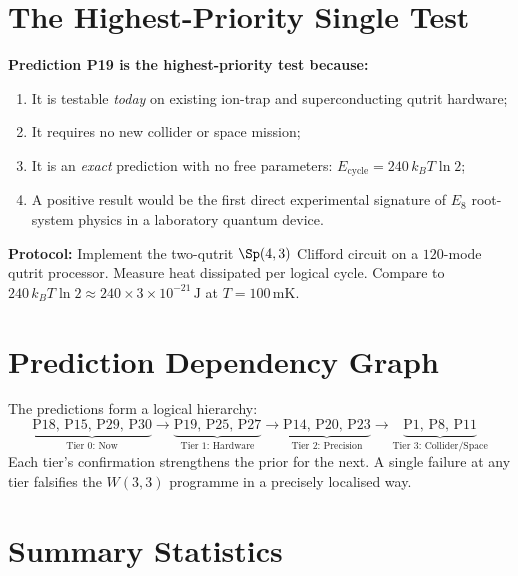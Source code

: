 \section{The Highest-Priority Single Test}
\label{sec:highest_priority}

\begin{tcolorbox}[colback=red!4!white,colframe=red!70!black,
  title=\textbf{Highest-Priority Experimental Test: P19}]
\textbf{Prediction P19 is the highest-priority test because:}
\begin{enumerate}[nosep]
  \item It is testable \emph{today} on existing ion-trap
        and superconducting qutrit hardware;
  \item It requires no new collider or space mission;
  \item It is an \emph{exact} prediction with no free
        parameters: $E_{\mathrm{cycle}}=240\,k_BT\ln 2$;
  \item A positive result would be the first direct
        experimental signature of $E_8$ root-system
        physics in a laboratory quantum device.
\end{enumerate}
\textbf{Protocol:} Implement the two-qutrit $\Sp(4,3)$ Clifford
circuit on a $120$-mode qutrit processor. Measure heat
dissipated per logical cycle. Compare to
$240\,k_BT\ln2 \approx 240 \times 3\times10^{-21}\,\mathrm{J}$
at $T=100\,\mathrm{mK}$.
\end{tcolorbox}

\section{Prediction Dependency Graph}
\label{sec:dep_graph}

\noindent
The predictions form a logical hierarchy:
\[
  \underbrace{\text{P18, P15, P29, P30}}_{\text{Tier 0: Now}}
  \to
  \underbrace{\text{P19, P25, P27}}_{\text{Tier 1: Hardware}}
  \to
  \underbrace{\text{P14, P20, P23}}_{\text{Tier 2: Precision}}
  \to
  \underbrace{\text{P1, P8, P11}}_{\text{Tier 3: Collider/Space}}
\]
Each tier's confirmation strengthens the prior for the next.
A single failure at any tier falsifies the $W(3,3)$ programme
in a precisely localised way.

\section{Summary Statistics}
\label{sec:roadmap_summary}

